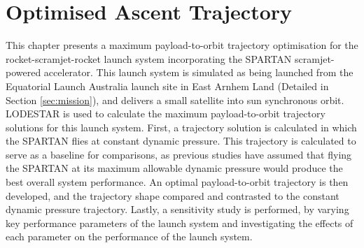 
\cleardoublepage
\chapter{Optimised Ascent Trajectory}\label{chapter:Ascent}

This chapter presents a maximum payload-to-orbit trajectory optimisation for the rocket-scramjet-rocket launch system incorporating the SPARTAN scramjet-powered accelerator. 
This launch system is simulated as being launched from the Equatorial Launch Australia launch site in East Arnhem Land (Detailed in Section \ref{sec:mission}), and delivers a small satellite into sun synchronous orbit. LODESTAR is used to calculate the maximum payload-to-orbit trajectory solutions for this launch system.
First, a trajectory solution is calculated in which the SPARTAN flies at constant dynamic pressure. This trajectory is calculated to serve as a baseline for comparisons, as previous studies have assumed that flying the SPARTAN at its maximum allowable dynamic pressure would produce the best overall system performance\cite{Preller2017b}. An optimal payload-to-orbit trajectory is then developed, and the trajectory shape compared and contrasted to the constant dynamic pressure trajectory.
Lastly, a sensitivity study is performed, by varying key performance parameters of the launch system and investigating the effects of each parameter on the performance of the launch system. 

